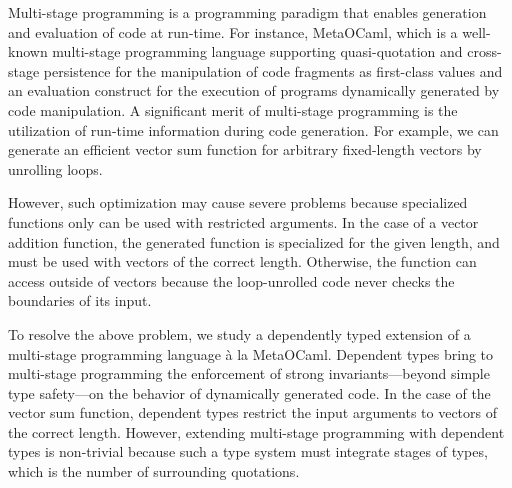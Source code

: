 \documentclass[master,english]{kuisthesis}
\begin{document}
\date{February 15, 2020}			%

\maketitle

\begin{eabstract}


Multi-stage programming is a programming paradigm that enables generation and evaluation of code at run-time. For instance, MetaOCaml, which is
a well-known multi-stage programming language supporting quasi-quotation and
cross-stage persistence for the manipulation of code fragments as first-class
values and an evaluation construct for the execution of programs dynamically
generated by code manipulation. A significant merit of multi-stage
programming is the utilization of run-time information during code generation. For
example, we can generate an efficient vector sum function for arbitrary
fixed-length vectors by unrolling loops.


However, such optimization may cause severe problems because specialized
functions only can be used with restricted arguments. In the case of a vector
addition function, the generated function is specialized for the given
length, and must be used with vectors of the correct length. Otherwise, the
function can access outside of vectors because the loop-unrolled code never
checks the boundaries of its input.


To resolve the above problem, we study a dependently typed extension of a
multi-stage programming language \`a la MetaOCaml. Dependent types bring to
multi-stage programming the enforcement of strong invariants---beyond simple
type safety---on the behavior of dynamically generated code. In the case of
the vector sum function, dependent types restrict the input arguments to vectors of the correct length. However, extending multi-stage programming
with dependent types is non-trivial because such a type system must
integrate stages of types, which is the number of surrounding quotations.


\end{eabstract}
\end{document}
